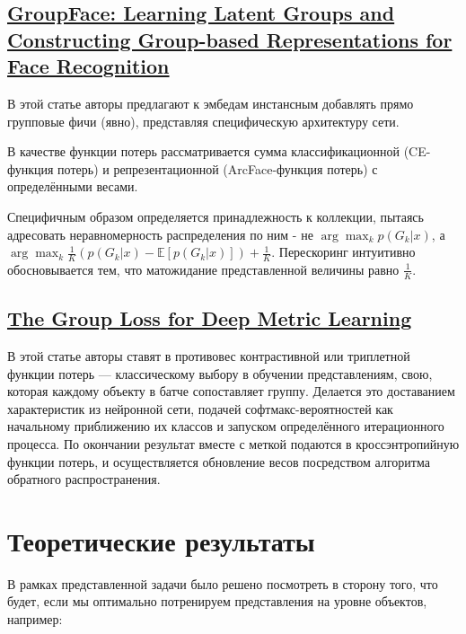 \documentclass{article}
\begin{document}
\subsection{\href{https://arxiv.org/pdf/2005.10497v2.pdf}{GroupFace: Learning Latent Groups and Constructing Group-based
Representations for Face Recognition}}

В этой статье авторы предлагают к эмбедам инстансным добавлять прямо групповые фичи (явно), представляя специфическую архитектуру сети. 

В качестве функции потерь рассматривается сумма классификационной (CE-функция потерь) и репрезентационной (ArcFace-функция потерь) с определёнными весами. 

Специфичным образом определяется принадлежность к коллекции, пытаясь адресовать неравномерность распределения по ним - не 
$\arg\max_k p(G_k | x)$, а $\arg\max_k \frac{1}{K}(p(G_k | x) - \mathbb{E}[p(G_k | x)]) + \frac{1}{K}$.
Перескоринг интуитивно обосновывается тем, что матожидание представленной величины равно $\frac{1}{K}$.

\subsection{\href{https://arxiv.org/pdf/1912.00385.pdf}{The Group Loss for Deep Metric Learning}}

В этой статье авторы ставят в противовес контрастивной или триплетной функции потерь --- классическому выбору в обучении представлениям, свою, которая каждому объекту в батче сопоставляет группу. Делается это доставанием характеристик из нейронной сети, подачей софтмакс-вероятностей как начальному приближению их классов и запуском определённого итерационного процесса. По окончании результат вместе с меткой подаются в кроссэнтропийную функции потерь, и осуществляется обновление весов посредством алгоритма обратного распространения.

\section{Теоретические результаты}

В рамках представленной задачи было решено посмотреть в сторону того, что будет, если мы оптимально потренируем представления на уровне объектов, например:
\end{document}
